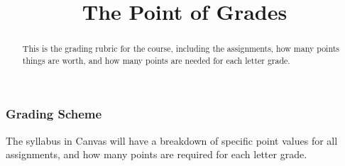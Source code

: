\documentclass{ximera}
\title{The Point of Grades}
\begin{document}
\begin{abstract}
This is the grading rubric for the course, including the assignments, how many points things are worth, and how many points are needed for each letter grade.
\end{abstract}
\maketitle

\subsubsection*{Grading Scheme}
The syllabus in Canvas will have a breakdown of specific point values for all assignments, and how many points are required for each letter grade.
\end{document}
